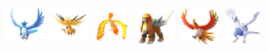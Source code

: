 \documentclass[12pt]{beamer}
\begin{document}
\begin{frame}[label=Rock]
\begin{footnotesize}
\begin{block}{}
\begin{center}
    \includegraphics[width=1.5cm]{../../images/pokemon/articuno.png}
    \includegraphics[width=1.5cm]{../../images/pokemon/zapdos.png}
    \includegraphics[width=1.5cm]{../../images/pokemon/moltres.png}
    \includegraphics[width=1.5cm]{../../images/pokemon/entei.png}
    \includegraphics[width=1.5cm]{../../images/pokemon/ho-oh.png}
    \includegraphics[width=1.5cm]{../../images/pokemon/lugia.png}
    \end{center}
\end{block}

\end{footnotesize}
\end{frame}


\end{document}
